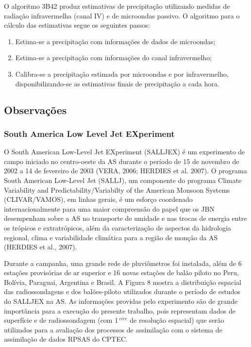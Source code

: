 O algoritmo 3B42 produz estimativas de precipitação utilizando medidas de radiação infravermelha (canal IV) e de microondas passivo. O algoritmo para o cálculo das estimativas segue os seguintes passos:

\begin{enumerate}
\item Estima-se a precipitação com informações de dados de microondas;
\item Estima-se a precipitação com informações do canal infravermelho;
\item Calibra-se a precipitação estimada por microondas e por infravermelho, disponibilizando-se as estimativas finais de precipitação a cada hora.
\end{enumerate}

\subsection{Observações}

\subsubsection{South America Low Level Jet EXperiment}

O South American Low-Level Jet EXperiment (SALLJEX) é um experimento de campo iniciado no centro-oeste da AS durante o período de 15 de novembro de 2002 a 14 de fevereiro de 2003 (VERA, 2006; HERDIES et al. 2007). O programa South American Low-Level Jet (SALLJ), um componente do programa Climate Variability and Predictability/Variabilty of the American Monsoon Systems (CLIVAR/VAMOS), em linhas gerais, é um esforço coordenado internacionalmente para uma maior compreensão do papel que os JBN desempenham sobre a AS no transporte de umidade e nas trocas de energia entre os trópicos e extratrópicos, além da caracterização de aspectos da hidrologia regional, clima e variabilidade climática para a região de monção da AS (HERDIES et al., 2007).

Durante a campanha, uma grande rede de pluviômetros foi instalada, além de 6 estações provisórias de ar superior e 16 novas estações de balão piloto no Peru, Bolívia, Paraguai, Argentina e Brasil. A Figura 8 mostra a distribuição espacial das radiossondagens e dos balões-piloto utilizados durante o período de estudos do SALLJEX na AS. As informações providas pelo experimento são de grande importância para a execução do presente trabalho, pois representam dados de superfície e de radiossondagem (com 1$\,^{circ}$ de resolução espacial) que serão utilizados para a avaliação dos processos de assimilação com o sistema de assimilação de dados RPSAS do CPTEC.

